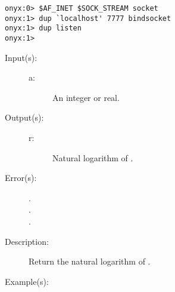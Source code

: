 \begin{description}
\begin{description}
\begin{verbatim}
onyx:0> $AF_INET $SOCK_STREAM socket
onyx:1> dup `localhost' 7777 bindsocket
onyx:1> dup listen
onyx:1>
		\end{verbatim}
	\end{description}
\label{systemdict:ln}
\item[{\onyxop{a}{ln}{r}}: ]
	\begin{description}\item[]
	\item[Input(s): ]
		\begin{description}\item[]
		\item[a: ]
			An integer or real.
		\end{description}
	\item[Output(s): ]
		\begin{description}\item[]
		\item[r: ]
			Natural logarithm of .
		\end{description}
	\item[Error(s): ]
		\begin{description}\item[]
		\item[.]
		\item[.]
		\item[.]
		\end{description}
	\item[Description: ]
		Return the natural logarithm of .
	\item[Example(s): ]\begin{verbatim}


\end{verbatim}
\end{description}
\end{description}
